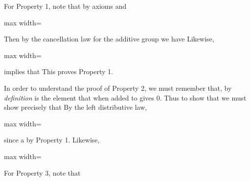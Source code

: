 \documentclass[11pt,oneside]{article}
\begin{document}
\BookNarrativetrue

\begin{BookBody}

 For Property 1, note that by axioms  and 

\begin{center}\begin{adjustbox}{max width=\linewidth}\end{adjustbox}\end{center}

\noindent Then by the cancellation law for the additive group  we have  Likewise,

\begin{center}\begin{adjustbox}{max width=\linewidth}\end{adjustbox}\end{center}

\noindent implies that  This proves Property 1.

In order to understand the proof of Property 2, we must remember that, by \textit{definition} is the element that when added to  gives 0. Thus to show that  we must show precisely that  By the left distributive law,

\begin{center}\begin{adjustbox}{max width=\linewidth}\end{adjustbox}\end{center}

\noindent since a by Property 1. Likewise,

\begin{center}\begin{adjustbox}{max width=\linewidth}\end{adjustbox}\end{center}

\noindent For Property 3, note that


\end{BookBody}
\end{document}
